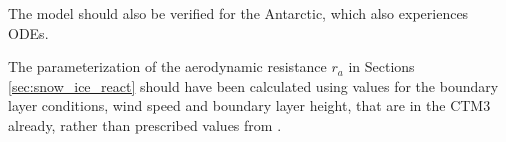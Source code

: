 \medskip

The model should also be verified for the Antarctic, which also experiences ODEs. 


\medskip

The parameterization of the aerodynamic resistance $r_a$ in Sections \ref{sec:snow_ice_react} should have been calculated using values for the boundary layer conditions, wind speed and boundary layer height, that are in the CTM3 already, rather than prescribed values from \cite{CAO}. 